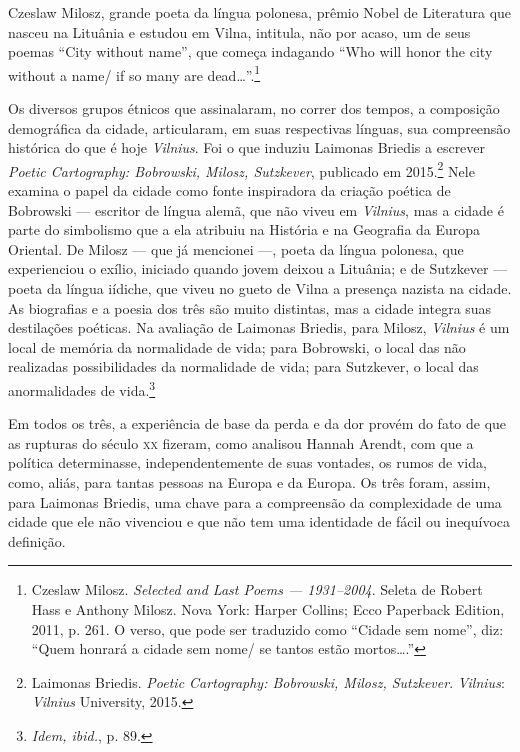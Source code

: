 Czeslaw Milosz, grande poeta da língua polonesa, prêmio Nobel de
Literatura que nasceu na Lituânia e estudou em Vilna, intitula, não por
acaso, um de seus poemas ``City without name'', que começa indagando
``Who will honor the city without a name/ if so many are
dead\ldots{}''.\footnote{Czeslaw Milosz. \textit{Selected and Last Poems ---
  1931--2004}. Seleta de Robert Hass e Anthony Milosz. Nova York: Harper
  Collins; Ecco Paperback Edition, 2011, p. 261. O verso, que pode ser traduzido como ``Cidade sem nome'', 
  diz: ``Quem honrará a cidade sem nome/ se tantos estão mortos\dots{}.''}

Os diversos grupos étnicos que assinalaram, no correr dos tempos, a
composição demográfica da cidade, articularam, em suas respectivas
línguas, sua compreensão histórica do que é hoje \textit{Vilnius}. Foi o que
induziu Laimonas Briedis a escrever \textit{Poetic Cartography:
 Bobrowski, Milosz, Sutzkever}, publicado em 2015.\footnote{Laimonas Briedis.
  \textit{Poetic Cartography: Bobrowski, Milosz, Sutzkever}. \textit{Vilnius}: \textit{Vilnius} University, 2015.} Nele examina
o papel da cidade como fonte inspiradora da criação poética de Bobrowski
--- escritor de língua alemã, que não viveu em \textit{Vilnius}, mas a cidade é
parte do simbolismo que a ela atribuiu na História e na Geografia da
Europa Oriental. De Milosz --- que já mencionei ---, poeta da língua
polonesa, que experienciou o exílio, iniciado quando jovem deixou a
Lituânia; e de Sutzkever --- poeta da língua iídiche, que viveu no gueto de
Vilna a presença nazista na cidade. As biografias e a poesia dos três
são muito distintas, mas a cidade integra suas destilações poéticas. Na
avaliação de Laimonas Briedis, para Milosz, \textit{Vilnius} é um local de
memória da normalidade de vida; para Bobrowski, o local das não
realizadas possibilidades da normalidade de vida; para Sutzkever, o
local das anormalidades de vida.\footnote{\textit{Idem, ibid.}, p. 89.}

Em todos os três, a experiência de base da perda e da dor provém do fato
de que as rupturas do século \textsc{xx} fizeram, como analisou Hannah Arendt,
com que a política determinasse, independentemente de suas vontades, os
rumos de vida, como, aliás, para tantas pessoas na Europa e da Europa.
Os três foram, assim, para Laimonas Briedis, uma chave para a
compreensão da complexidade de uma cidade que ele não vivenciou e que
não tem uma identidade de fácil ou inequívoca definição.


